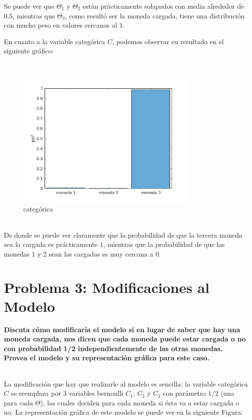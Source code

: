 Se puede ver que $\Theta_{1}$ y $\Theta_{2}$ están prácticamente solapados con media alrededor de $0.5$, mientras que $\Theta_{3}$, como resultó ser la moneda cargada, tiene una
distribución con mucho peso en valores cercanos al $1$.	

\newpage

En cuanto a la variable categórica $C$, podemos observar su resultado en el siguiente gráfico:

~\\
\begin{figure}[h]
    \includegraphics[width=0.8\textwidth]{imagenes/categorica.jpg}
  \caption{categórica}
\end{figure}
~\\

De donde se puede ver claramente que la probabilidad de que la tercera moneda sea la cargada es prácticamente $1$, mientras que la probabilidad de que las monedas 1 y 2 sean las
cargadas es muy cercana a $0$.



\newpage

\section{Problema 3: Modificaciones al Modelo}

\textbf{Discuta cómo modificaría el modelo si en lugar de saber que hay una moneda cargada, nos dicen que cada moneda puede estar cargada o no con probabilidad 1/2 independientemente
de las otras monedas. Provea el modelo y su representación gráfica para este caso.}

~\\
La modificación que hay que realizarle al modelo es sencilla: la variable categórica $C$ se reemplaza por 3 variables bernoulli $C_{1}$, $C_{2}$ y $C_{3}$ con parámetro $1/2$ (una para cada $\Theta$),
las cuales deciden para cada moneda si ésta va a estar cargada o no. La representación gráfica de este modelo se puede ver en la siguiente Figura:

